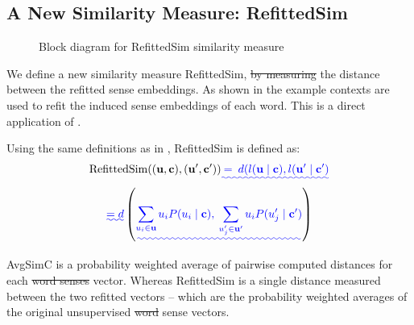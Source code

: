 \documentclass{article} %
\renewcommand{\c}{\mathbf{c}}
\renewcommand{\u}{\mathbf{u}}
\providecommand{\DIFadd}[1]{{\protect\color{blue}\uwave{#1}}} %
\providecommand{\DIFdel}[1]{{\protect\color{red}\sout{#1}}}                      %
\providecommand{\DIFaddbegin}{} %
\providecommand{\DIFaddend}{} %
\providecommand{\DIFdelbegin}{} %
\providecommand{\DIFdelend}{} %
\begin{document}
\DIFdelend \subsection{A New Similarity Measure: RefittedSim}\label{RefittedSimVsAvgSimC}
\begin{figure}
	\begin{adjustbox}{max width=\columnwidth}
	
	\end{adjustbox}
	\caption{Block diagram for RefittedSim similarity measure} \label{diaRefittedSim}
\end{figure}
We define a new similarity measure RefittedSim, \DIFdelbegin \DIFdel{by measuring }\DIFdelend \DIFaddbegin \DIFadd{as }\DIFaddend the distance between the refitted sense embeddings.
As shown in  the example contexts are used to refit the induced sense embeddings of each word.
This is a direct application of  .

Using the same definitions as in , RefittedSim is defined as:
\begin{multline} \label{eq:refittedsim}
\mathrm{RefittedSim}((\u,\c),(\u^{\prime},\c^{\prime}))
\DIFaddbegin \DIFadd{\:=\: d(l(\u \mid \c), l(\u^\prime \mid \c^\prime)}\DIFaddend \\
\DIFdelbegin %
\DIFdelend \DIFaddbegin \DIFadd{= d}\left(
\DIFadd{\sum_{u_{i}\in\u}u_{i}P(u_{i}\mid\c),\:
\sum_{u_{j}^{\prime}\in\u^{\prime}}u_{i}P(u_{j}^{\prime}\mid\c^{\prime})}\right)
\DIFaddend \end{multline}

AvgSimC is a probability weighted average of pairwise computed distances for each \DIFdelbegin \DIFdel{word senses }\DIFdelend \DIFaddbegin \DIFadd{sense }\DIFaddend vector.
Whereas RefittedSim is a single distance measured between the two refitted vectors -- which are the probability weighted averages of the original unsupervised \DIFdelbegin \DIFdel{word }\DIFdelend sense vectors.
\end{document}
